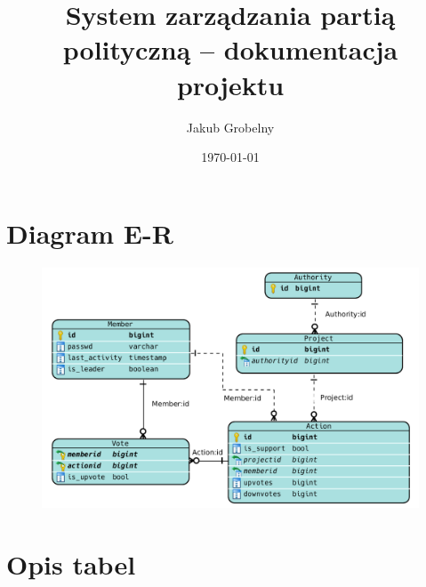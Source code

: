 \documentclass[12pt]{article}
\title{\huge\textbf{System zarządzania partią polityczną -- dokumentacja projektu}}
\author{\Large Jakub Grobelny}
\date{\today}
\begin{document}
\maketitle

\section{Diagram E-R}

\begin{figure}[H]
    \includegraphics[scale=0.42]{schema-final.png}
\label{figure:er}
\end{figure}

\section{Opis tabel}
\end{document}
